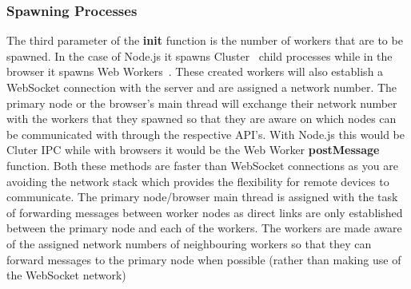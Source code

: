 \documentclass[12pt, a4paper]{report}
\theoremstyle{definition}
\theoremstyle{definition}%
\theoremstyle{definition}%
\theoremstyle{definition}%
\theoremstyle{definition}%
\theoremstyle{definition}%
\begin{document}
\subsubsection{Spawning Processes}
The third parameter of the \textbf{init} function is the number of workers that are to be spawned. In the case of Node.js it spawns Cluster~\cite{cluster} child processes while in the browser it spawns Web Workers~\cite{webworkers}. These created workers will also establish a WebSocket connection with the server and are assigned a network number. The primary node or the browser's main thread will exchange their network number with the workers that they spawned so that they are aware on which nodes can be communicated with through the respective API's. With Node.js this would be Cluter IPC while with browsers it would be the Web Worker \textbf{postMessage} function. Both these methods are faster than WebSocket connections as you are avoiding the network stack which provides the flexibility for remote devices to communicate. The primary node/browser main thread is assigned with the task of forwarding messages between worker nodes as direct links are only established between the primary node and each of the workers. The workers are made aware of the assigned network numbers of neighbouring workers so that they can forward messages to the primary node when possible (rather than making use of the WebSocket network)
\end{document}
